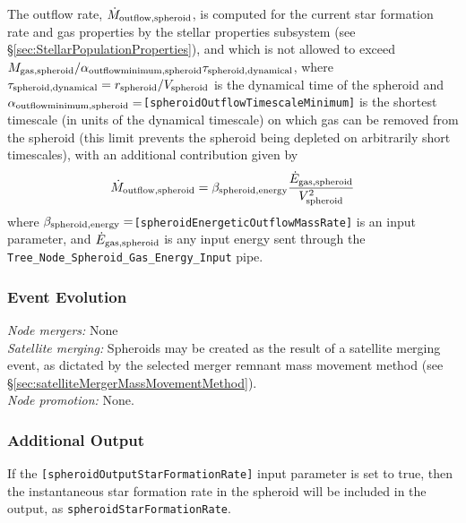 The outflow rate, $\dot{M}_{\rm outflow, spheroid}$, is computed for the current star formation rate and gas properties by the stellar properties subsystem (see \S\ref{sec:StellarPopulationProperties}), and which is not allowed to exceed $M_{\rm gas, spheroid}/ \alpha_{\rm outflow minimum, spheroid} \tau_{\rm spheroid, dynamical}$, where $\tau_{\rm spheroid, dynamical}=r_{\rm spheroid}/V_{\rm spheroid}$ is the dynamical time of the spheroid and $\alpha_{\rm outflow minimum, spheroid}=${\tt [spheroidOutflowTimescaleMinimum]} is the shortest timescale (in units of the dynamical timescale) on which gas can be removed from the spheroid (this limit prevents the spheroid being depleted on arbitrarily short timescales), with an additional contribution given by
\begin{equation}
 \dot{M}_{\rm outflow, spheroid} = \beta_{\rm spheroid, energy} {\dot{E}_{\rm gas, spheroid} \over V_{\rm spheroid}^2}
\end{equation}
where $\beta_{\rm spheroid, energy}=${\tt [spheroidEnergeticOutflowMassRate]} is an input parameter, and $\dot{E}_{\rm gas,spheroid}$ is any input energy sent through the {\tt Tree\_Node\_Spheroid\_Gas\_Energy\_Input} pipe.

\subsubsection{Event Evolution}

\noindent\emph{Node mergers:} None\\

\noindent\emph{Satellite merging:} Spheroids may be created as the result of a satellite merging event, as dictated by the selected merger remnant mass movement method (see \S\ref{sec:satelliteMergerMassMovementMethod}).\\

\noindent\emph{Node promotion:} None.\\

\subsubsection{Additional Output}

If the {\tt [spheroidOutputStarFormationRate]} input parameter is set to true, then the instantaneous star formation rate in the spheroid will be included in the output, as {\tt spheroidStarFormationRate}.

